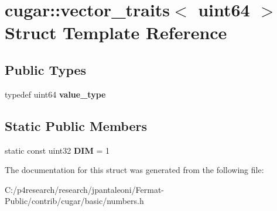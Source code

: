 \hypertarget{structcugar_1_1vector__traits_3_01uint64_01_4}{}\section{cugar\+:\+:vector\+\_\+traits$<$ uint64 $>$ Struct Template Reference}
\label{structcugar_1_1vector__traits_3_01uint64_01_4}
\subsection*{Public Types}
\begin{DoxyCompactItemize}
\item 
\mbox{\label{structcugar_1_1vector__traits_3_01uint64_01_4_a0d1b634050e018fbb4b8bd7e9f0681b0}} 
typedef uint64 {\bfseries value\+\_\+type}
\end{DoxyCompactItemize}
\subsection*{Static Public Members}
\begin{DoxyCompactItemize}
\item 
\mbox{\label{structcugar_1_1vector__traits_3_01uint64_01_4_afc87ad99eeae3b99dc7615e42ca0b5c2}} 
static const uint32 {\bfseries D\+IM} = 1
\end{DoxyCompactItemize}


The documentation for this struct was generated from the following file\+:\begin{DoxyCompactItemize}
\item 
C\+:/p4research/research/jpantaleoni/\+Fermat-\/\+Public/contrib/cugar/basic/numbers.\+h\end{DoxyCompactItemize}

